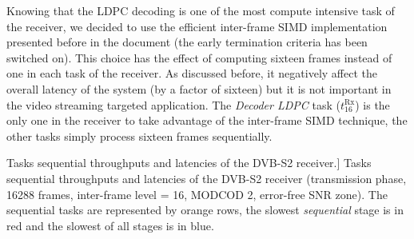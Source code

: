 Knowing that the LDPC decoding is one of the most compute intensive task of the
receiver, we decided to use the efficient inter-frame SIMD implementation
presented before in the document (the early termination criteria has been
switched on). This choice has the effect of computing sixteen frames instead of
one in each task of the receiver. As discussed before, it negatively affect the
overall latency of the system (by a factor of sixteen) but it is not important
in the video streaming targeted application. The \emph{Decoder LDPC} task
($t^\text{Rx}_{16}$) is the only one in the receiver to take advantage of the
inter-frame SIMD technique, the other tasks simply process sixteen frames
sequentially.

\begin{table}[htp]
  \centering
  \caption
    [Tasks sequential throughputs and latencies of the DVB-S2 receiver.]
    {Tasks sequential throughputs and latencies of the DVB-S2 receiver
    (transmission phase, 16288 frames, inter-frame level = 16, MODCOD 2,
    error-free SNR zone).
    The sequential tasks are represented by \colorbox{Paired-7!15}{orange} rows,
    the slowest \emph{sequential} stage is in \colorbox{Paired-5!15}{red} and
    the slowest of all stages is in \colorbox{Paired-1!15}{blue}.}
  \label{tab:dvbs2_tasks_thr_lat}
  {}
\end{table}
